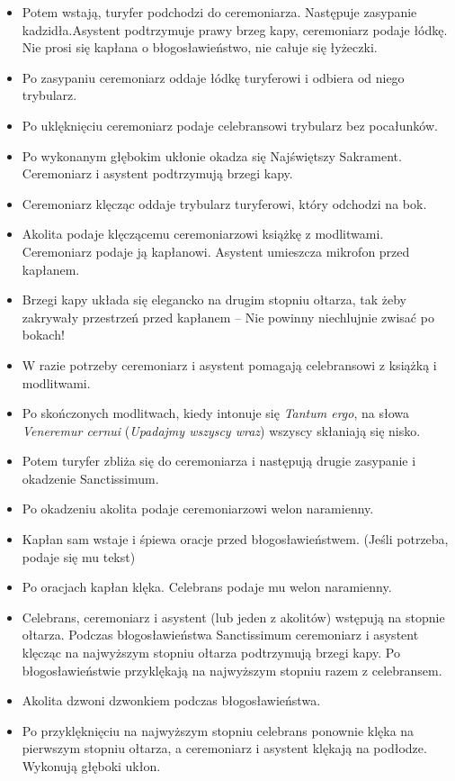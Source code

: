 \begin{itemize}
			\item Potem wstają, turyfer podchodzi do ceremoniarza. Następuje zasypanie kadzidła.Asystent podtrzymuje prawy brzeg kapy, ceremoniarz podaje łódkę. Nie prosi się kapłana o błogosławieństwo, nie całuje się łyżeczki.
			\item  Po zasypaniu ceremoniarz oddaje łódkę turyferowi i odbiera od niego trybularz.
			\item Po uklęknięciu ceremoniarz podaje celebransowi trybularz bez pocałunków.
			\item Po wykonanym głębokim ukłonie okadza się Najświętszy Sakrament. Ceremoniarz i asystent podtrzymują brzegi kapy.
			\item Ceremoniarz klęcząc oddaje trybularz turyferowi, który odchodzi na bok.
			\item Akolita podaje klęczącemu ceremoniarzowi książkę z modlitwami. Ceremoniarz podaje ją kapłanowi. Asystent umieszcza mikrofon przed kapłanem.
			\item Brzegi kapy układa się elegancko na drugim stopniu ołtarza, tak żeby zakrywały przestrzeń przed kapłanem – Nie powinny niechlujnie zwisać po bokach!
			\item W razie potrzeby ceremoniarz i asystent pomagają celebransowi z książką i modlitwami.
			\item Po skończonych modlitwach, kiedy intonuje się \textit{Tantum ergo}, na słowa \textit{Veneremur cernui} (\textit{Upadajmy wszyscy wraz}) wszyscy skłaniają się nisko.
			\item  Potem turyfer zbliża się do ceremoniarza i następują drugie zasypanie i okadzenie Sanctissimum.
			\item Po okadzeniu akolita podaje ceremoniarzowi welon naramienny.
			\item Kapłan sam wstaje i śpiewa oracje przed błogosławieństwem. (Jeśli potrzeba, podaje się mu tekst)
			\item  Po oracjach kapłan klęka. Celebrans podaje mu welon naramienny.
			\item Celebrans, ceremoniarz i asystent (lub jeden z akolitów) wstępują na stopnie ołtarza. Podczas błogosławieństwa Sanctissimum ceremoniarz i asystent klęcząc na najwyższym stopniu ołtarza podtrzymują brzegi kapy. Po błogosławieństwie przyklękają na najwyższym stopniu razem z celebransem.
			\item Akolita dzwoni dzwonkiem podczas błogosławieństwa.
			\item Po przyklęknięciu na najwyższym stopniu celebrans ponownie klęka na pierwszym stopniu ołtarza, a ceremoniarz i asystent klękają na podłodze. Wykonują głęboki ukłon.

\end{itemize}
